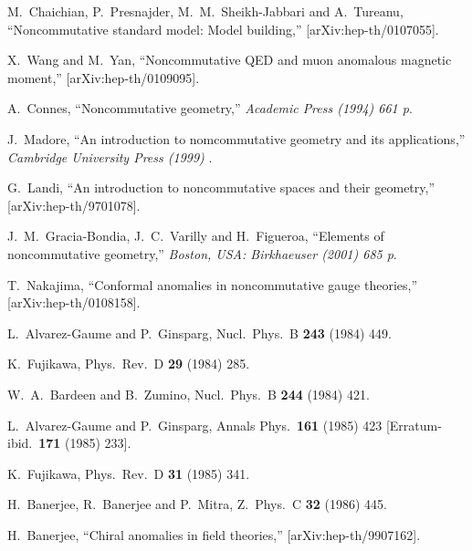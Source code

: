 \documentclass[a4paper,12pt]{article}
\begin{document}
\begin{thebibliography}{99}
M.~Chaichian, P.~Presnajder, M.~M.~Sheikh-Jabbari and A.~Tureanu,
``Noncommutative standard model: Model building,''
[arXiv:hep-th/0107055].


X.~Wang and M.~Yan,
``Noncommutative QED and muon anomalous magnetic moment,''
[arXiv:hep-th/0109095].




A.~Connes,
``Noncommutative geometry,''
{\it  Academic Press (1994) 661 p}.

J.~Madore,
``An introduction to nomcommutative geometry and its applications,''
{\it  Cambridge University Press (1999) }.


G.~Landi,
``An introduction to noncommutative spaces and their geometry,''
[arXiv:hep-th/9701078].

J.~M.~Gracia-Bondia, J.~C.~Varilly and H.~Figueroa,
``Elements of noncommutative geometry,''
{\it  Boston, USA: Birkhaeuser (2001) 685 p}.


T.~Nakajima,
``Conformal anomalies in noncommutative gauge theories,''
[arXiv:hep-th/0108158].




L.~Alvarez-Gaume and P.~Ginsparg,
Nucl.\ Phys.\ B {\bf 243} (1984) 449.

K.~Fujikawa,
Phys.\ Rev.\ D {\bf 29} (1984) 285.

W.~A.~Bardeen and B.~Zumino,
Nucl.\ Phys.\ B {\bf 244} (1984) 421.

L.~Alvarez-Gaume and P.~Ginsparg,
Annals Phys.\  {\bf 161} (1985) 423
[Erratum-ibid.\  {\bf 171} (1985) 233].

K.~Fujikawa,
Phys.\ Rev.\ D {\bf 31} (1985) 341.

H.~Banerjee, R.~Banerjee and P.~Mitra,
Z.\ Phys.\ C {\bf 32} (1986) 445.

H.~Banerjee,
``Chiral anomalies in field theories,''
[arXiv:hep-th/9907162].


\end{thebibliography}
\end{document}

